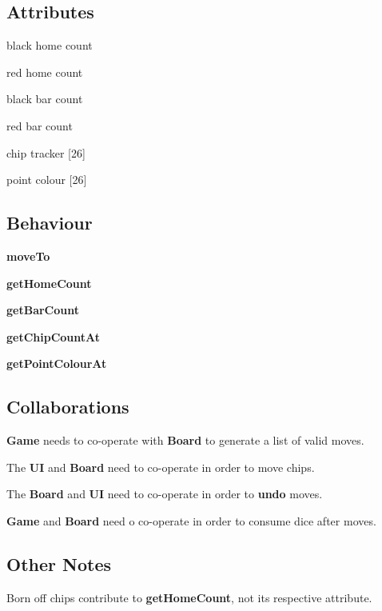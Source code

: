 \begin{multicols}{2}
    \begin{dashed}
        \subsection{Attributes}
        \item black home count
        \item red home count
        \item black bar count
        \item red bar count
        \item chip tracker [26]
        \item point colour [26]
    \end{dashed}

    \begin{dashed}
        \subsection{Behaviour}
        \item \textbf{moveTo}
        \item \textbf{getHomeCount}
        \item \textbf{getBarCount}
        \item \textbf{getChipCountAt}
        \item \textbf{getPointColourAt}
    \end{dashed}
\end{multicols}

\subsection{Collaborations}
\begin{dashed}
    \item \textbf{Game} needs to co-operate with \textbf{Board} to generate a list of valid moves.
    \item The \textbf{UI} and \textbf{Board} need to co-operate in order to move chips.
    \item The \textbf{Board} and \textbf{UI} need to co-operate in order to \textbf{undo} moves.
    \item \textbf{Game} and \textbf{Board} need o co-operate in order to consume dice after moves.
\end{dashed}

\subsection{Other Notes}
\begin{dashed}
    \item Born off chips contribute to \textbf{getHomeCount}, not its respective attribute.
\end{dashed}

